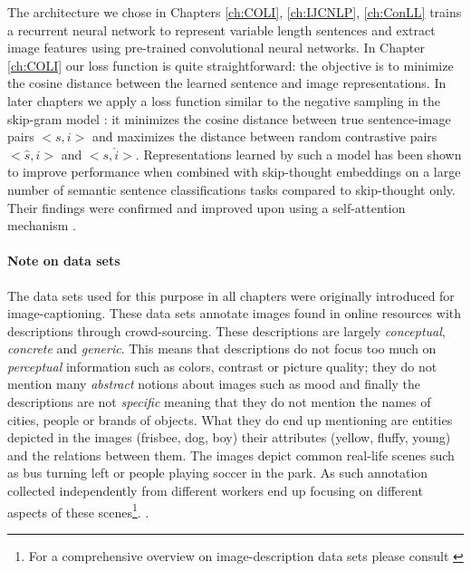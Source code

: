 The architecture we chose in
Chapters \ref{ch:COLI}, \ref{ch:IJCNLP}, \ref{ch:ConLL} trains a recurrent neural network to
represent variable length sentences and extract image features using pre-trained
convolutional neural networks. In Chapter \ref{ch:COLI} our loss function
is quite straightforward: the objective is to minimize the cosine distance
between the learned sentence and image representations. In later chapters we
apply a loss function similar to the negative sampling
in the skip-gram model \citep{mikolov2013distributed}: it minimizes the cosine
distance between true sentence-image pairs $<s, i>$ and maximizes the distance
between random contrastive pairs $<\hat{s}, i>$ and $<s, \hat{i}>$.
Representations learned by such a model has been shown \citep{kiela2017learning}
to improve performance when combined with skip-thought embeddings
on a large number of semantic sentence classifications tasks compared to
skip-thought only. Their findings were confirmed and improved upon using a
self-attention mechanism \citep{yoo2017improving}.

\paragraph{Note on data sets}


The data sets used for this purpose in all chapters were originally
introduced for image-captioning.
These data sets annotate images found in online resources with descriptions
through crowd-sourcing.
These descriptions are largely \emph{conceptual}, \emph{concrete}
and \emph{generic}.
This means that descriptions do not focus too much on \emph{perceptual}
information such as colors, contrast or picture quality; they do not mention
many \emph{abstract} notions about images such as mood and finally the descriptions
are not \emph{specific} meaning that they do not mention the names of cities,
people or brands of objects.
What they do end up mentioning are entities depicted in the images
(frisbee, dog, boy) their attributes (yellow, fluffy, young) and the
relations between them.
The images depict common real-life scenes such as bus turning left or people
playing soccer in the park. As such annotation collected independently from
different workers end up focusing on different aspects of these scenes\footnote{For a comprehensive overview on image-description data sets
please consult \cite{bernardi2016automatic}}.
.

